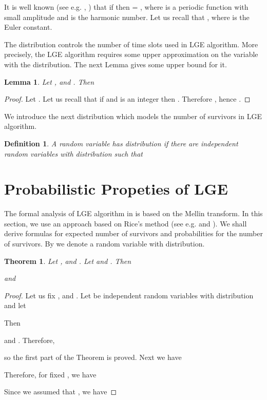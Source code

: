 \documentclass[proceedings]{dmtcs}
\newtheorem{definition}{Definition}
\newtheorem{lemma}{Lemma}
\newtheorem{theorem}{Theorem}
\begin{document}
It is well known  (see e.g. \cite{Szpankowski:1990:YAB:78907.78914},
\cite{DBLP:journals/fuin/CichonK13}) that if  then
 = , 
where  is a periodic function with small amplitude and  is the  harmonic number.
Let us recall that , where  is the Euler constant.

The distribution  controls the number of time slots used in LGE algorithm.
More precisely, the LGE algorithm requires some upper approximation on the variable 
with the  distribution. The next Lemma gives some upper bound for it.

\begin{lemma}
\label{lemma:boundNumberRounds}
Let ,  and . Then

\end{lemma}

\begin{proof}
Let . Let us recall that if  and  is an integer then  .
Therefore , hence
.
\end{proof}

We introduce the next distribution which models the number of survivors in LGE algorithm.

\begin{definition}
A random variable  has distribution  if there are independent random variables 
 with distribution  such that 

\end{definition}



\section{Probabilistic Propeties of LGE}

The formal analysis of LGE algorithm in \cite{DBLP:conf/mascots/JacquetMM13} is based 
on the Mellin transform. In this section, we use an approach based on Rice's method (see e.g. \cite{Knuth:1998:ACP:280635} and \cite{journals/tcs/FlajoletS95}). We shall derive formulas for expected number of survivors and probabilities  
for the number of survivors. By  we denote a random variable with  distribution.
  
\begin{theorem}
\label{theorem:winners}
Let ,  and . Let  and . Then

and

\end{theorem}

\begin{proof} 
Let us fix ,  and .
Let  be independent random variables with distribution  and
let

Then

and 
.
Therefore,

so the first part of the Theorem is proved.
Next we have

Therefore, for fixed , we have


Since we assumed that , we have


\end{proof}
\end{document}
